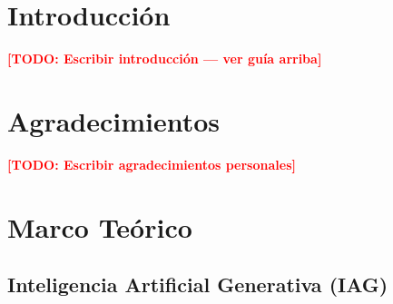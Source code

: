 \documentclass[12pt, letterpaper, oneside]{article}
\newcommand{\TODO}[1]{\textcolor{red}{\textbf{[TODO: #1]}}}
\begin{document}
\section{Introducción}
\label{sec:introduccion}


\TODO{Escribir introducción — ver guía arriba}


\section{Agradecimientos}
\label{sec:agradecimientos}

\TODO{Escribir agradecimientos personales}


\section{Marco Teórico}
\label{sec:marco-teorico}


\subsection{Inteligencia Artificial Generativa (IAG)}
\label{subsec:iag}

\end{document}
